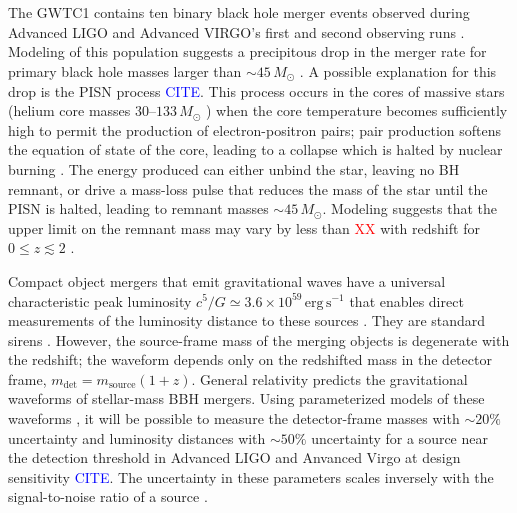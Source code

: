 \documentclass[modern]{aastex62}
\newcommand{\citationhere}{\textcolor{blue}{CITE}}
\newcommand{\fixme}[1]{\textcolor{red}{#1}}
\newcommand{\MSourceMax}{45 \, M_\odot}
\newcommand{\MSun}{M_\odot}
\begin{document}
\section*{ }

The \ac{GWTC1} contains ten binary black hole merger events observed during
Advanced LIGO and Advanced VIRGO's first and second observing runs
\citep{GWTC-1}. Modeling of this population suggests a precipitous drop in the
merger rate for primary black hole masses larger than $\sim \MSourceMax{}$
\citep{Fishbach2017,GWTC-1}.  A possible explanation for this drop is the
\ac{PISN} process \citationhere{}. This process occurs in the cores of massive
stars (helium core masses $30$--$133 \, \MSun$ \citep{Woosley2017}) when the
core temperature becomes sufficiently high to permit the production of
electron-positron pairs; pair production softens the equation of state of the
core, leading to a collapse which is halted by nuclear burning
\citep{Heger2002}.  The energy produced can either unbind the star, leaving no
\ac{BH} remnant, or drive a mass-loss pulse that reduces the mass of the star
until the \ac{PISN} is halted, leading to remnant masses $\sim \MSourceMax{}$.
Modeling suggests that the upper limit on the remnant mass may vary by less than
\fixme{XX} with redshift for $0 \leq z \lesssim 2$ \citep{Belczynski2016}.

Compact object mergers that emit gravitational waves have a universal
characteristic peak luminosity $c^5/G \simeq 3.6 \times 10^{59} \, \mathrm{erg}
\, \mathrm{s}^{-1}$ that enables direct measurements of the luminosity distance
to these sources \citep{Schutz1986}.  They are standard sirens \citep{Holz2005}.
However, the source-frame mass of the merging objects is degenerate with the
redshift; the waveform depends only on the redshifted mass in the detector
frame, $m_\mathrm{det} = m_\mathrm{source} (1 + z)$.  General relativity
predicts the gravitational waveforms of stellar-mass \ac{BBH} mergers.  Using
parameterized models of these waveforms
\citep{Taracchini2014,Kahn2016,Bohe2017,Chatziioannou2017}, it will be possible
to measure the detector-frame masses with $\sim 20\%$ uncertainty and luminosity
distances \citep{Hogg1999} with $\sim 50\%$ uncertainty for a source near the
detection threshold in Advanced LIGO and Anvanced Virgo at design sensitivity
\citep{Vitale2017} \citationhere{}.  The uncertainty in these parameters scales
inversely with the signal-to-noise ratio of a source \citep{Vitale2017}.
\end{document}

